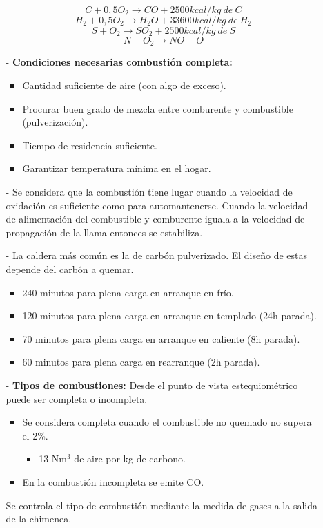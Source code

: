 \begin{enumerate}
\begin{itemize}
			\[C+0,5O_2\rightarrow CO +2500kcal/kg \ de \ C\]
			\[H_2+0,5O_2\rightarrow H_2O +33600kcal/kg \ de \ H_2\]
			\[S+O_2\rightarrow SO_2 +2500kcal/kg \ de \ S\]
			\[N+O_2\rightarrow NO+O\]
			\item [-] \textbf{Condiciones necesarias combustión completa:}
			\begin{itemize}
				\item Cantidad suficiente de aire (con algo de exceso).
				\item Procurar buen grado de mezcla entre comburente y combustible (pulverización).
				\item Tiempo de residencia suficiente.
				\item Garantizar temperatura mínima en el hogar.
			\end{itemize}
			\item [-] Se considera que la combustión tiene lugar cuando la velocidad de oxidación es suficiente como para automantenerse. Cuando la velocidad de alimentación del combustible y comburente iguala a la velocidad de
			propagación de la llama entonces se estabiliza.
			\item [-]La caldera más común es la de carbón pulverizado. El diseño de estas depende del carbón a quemar.
			\begin{itemize}
				\item 240 minutos para plena carga en arranque en frío.
				\item 120 minutos para plena carga en arranque en templado (24h parada).
				\item 70 minutos para plena carga en arranque en caliente (8h parada).
				\item 60 minutos para plena carga en rearranque (2h parada).
			\end{itemize}
			\item [-] \textbf{Tipos de combustiones:} Desde el punto de vista estequiométrico puede ser completa o incompleta.
			\begin{itemize}
				\item Se considera completa cuando el combustible no quemado no supera el 2\%.
				\begin{itemize}
					\item 13 Nm$^3$ de aire por kg de carbono.
				\end{itemize}
				\item En la combustión incompleta se emite CO.
			\end{itemize}
			Se controla el tipo de combustión mediante la medida de gases a la salida de la chimenea.

\end{itemize}
\end{enumerate}
